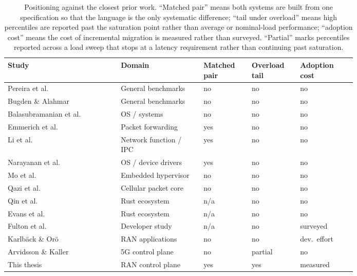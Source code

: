 \documentclass[english,twoside,openright,a4paper,censored,csm,software-track-2020]{HYthesisML}
\begin{document}
\begin{table}
\centering
\small
\caption{Positioning against the closest prior work. ``Matched pair'' means both systems are
built from one specification so that the language is the only systematic difference; ``tail
under overload'' means high percentiles are reported past the saturation point rather than
average or nominal-load performance; ``adoption cost'' means the cost of incremental migration
is measured rather than surveyed. ``Partial'' marks percentiles reported across a load sweep
that stops at a latency requirement rather than continuing past
saturation.\label{tab:related}}
\renewcommand{\arraystretch}{1.2}
\small
\begin{tabular}{@{}R{0.26\linewidth} R{0.19\linewidth} R{0.11\linewidth} R{0.10\linewidth} R{0.13\linewidth}@{}}
\hline\hline
Study & Domain & Matched pair & Overload tail & Adoption cost \\
\hline
Pereira et al.~\cite{pereira2017energy}      & General benchmarks  & no  & no  & no  \\
Bugden \& Alahmar~\cite{bugden2022rust}      & General benchmarks  & no  & no  & no  \\
Balasubramanian et al.~\cite{balasubramanian2017rust} & OS / systems & no & no & no \\
Emmerich et al.~\cite{emmerich2019drivers}   & Packet forwarding   & yes & no  & no  \\
Li et al.~\cite{li2021ipc}                   & Network function / IPC & yes & no & no \\
Narayanan et al.~\cite{narayanan2020redleaf} & OS / device drivers & yes & no  & no  \\
Mo et al.~\cite{mo2023rustshyper}            & Embedded hypervisor & no  & no  & no  \\
Qazi et al.~\cite{qazi2017pepc}              & Cellular packet core & no & no  & no  \\
Qin et al.~\cite{qin2020rust}                & Rust ecosystem      & n/a & no  & no  \\
Evans et al.~\cite{evans2020rust}            & Rust ecosystem      & n/a & no  & no  \\
Fulton et al.~\cite{fulton2021adopting}      & Developer study     & n/a & no  & surveyed \\
Karlb\"ack \& Or\"o~\cite{karlback2021ran}   & RAN applications    & no  & no  & dev.\ effort \\
Arvidsson \& Kaller~\cite{arvidsson2025async} & 5G control plane   & no  & partial & no \\
\hline
This thesis & RAN control plane & yes & yes & measured \\
\hline
\end{tabular}
\end{table}
\end{document}
